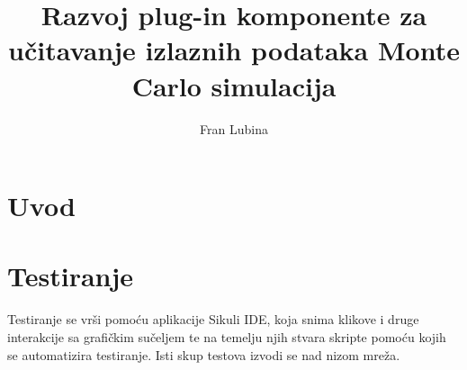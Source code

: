 \documentclass[times, utf8, zavrsni]{fer}
\begin{document}

\title{Razvoj plug-in komponente za učitavanje izlaznih podataka Monte Carlo simulacija}


\author{Fran Lubina}

\maketitle

\izvornik


\tableofcontents

\chapter{Uvod}

\chapter{Testiranje}
Testiranje se vrši pomoću aplikacije Sikuli IDE, koja snima klikove i druge interakcije sa grafičkim sučeljem te na temelju njih stvara skripte pomoću kojih se automatizira testiranje.
Isti skup testova izvodi se nad nizom mreža.
	
\end{document}
